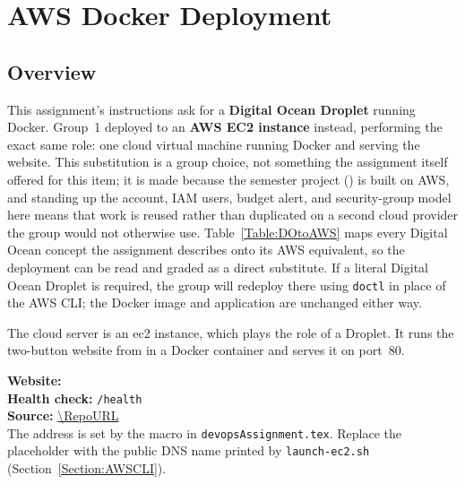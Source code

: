 \chapter{AWS Docker Deployment}

\section{Overview}
\begin{devopsNote}
This assignment's instructions ask for a \textbf{Digital Ocean Droplet}
running Docker. Group~1 deployed to an \textbf{AWS EC2 instance} instead,
performing the exact same role: one cloud virtual machine running Docker and
serving the website. This substitution is a group choice, not something the
assignment itself offered for this item; it is made because the semester
project () is built on AWS, and standing up the
account, IAM users, budget alert, and security-group model here means that
work is reused rather than duplicated on a second cloud provider the group
would not otherwise use. Table~\ref{Table:DOtoAWS} maps every Digital Ocean
concept the assignment describes onto its AWS equivalent, so the deployment
can be read and graded as a direct substitute. If a literal Digital Ocean
Droplet is required, the group will redeploy there using \texttt{doctl} in
place of the AWS CLI; the Docker image and application are unchanged either
way.
\end{devopsNote}
The cloud server is an \gls{ec2} instance, which plays the role of a Droplet.
It runs the two-button website from  in a
Docker container and serves it on port~80.

\begin{devopsNote}
\textbf{Website:} \texttt{\WebsiteURL}\\
\textbf{Health check:} \texttt{\WebsiteURL/health}\\
\textbf{Source:} \url{\RepoURL}\\[3pt]
\small The address is set by the \texttt{\string\WebsiteURL} macro in
\texttt{devopsAssignment.tex}. Replace the placeholder with the public DNS name
printed by \texttt{launch-ec2.sh} (Section~\ref{Section:AWSCLI}).
\end{devopsNote}

